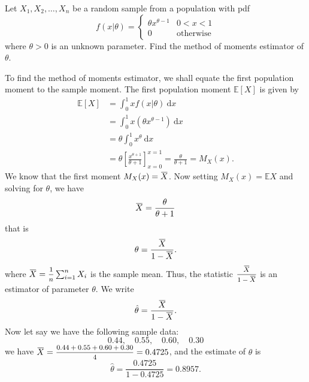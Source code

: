 \begin{example}
    Let $X_1, X_2, \ldots, X_n$ be a random sample from a population with pdf 
    \[
        f(x|\theta) = \begin{cases}
            \theta x^{\theta - 1} & 0 < x < 1\\
            0 & \text{otherwise}
        \end{cases}
    \]
    where $\theta > 0$ is an unknown parameter. Find the method of moments estimator of $\theta$.
\end{example}
\begin{solution}
    To find the method of moments estimator, we shall equate the first population moment to the sample moment.
    The first population moment $\mathbb{E}[X]$ is given by
    \begin{align*}
        \mathbb{E}[X] &= \int_0^1 x f(x|\theta) \> \mathrm{d}x\\
        &= \int_0^1 x (\theta x^{\theta - 1} )\> \mathrm{d}x\\
        &= \theta \int_0^1 x^{\theta} \> \mathrm{d}x\\
        &= \theta \left[ \frac{x^{\theta + 1}}{\theta + 1} \right]_{x=0}^{x=1} = \frac{\theta}{\theta + 1} = M_X(x).
    \end{align*}
    We know that the first moment $M_X(x) = \ols{X}$. Now setting $M_X(x) = \mathbb{E}{X}$ 
    and solving for $\theta$, we have
    \[
        \ols{X} = \frac{\theta}{\theta + 1} 
    \]
    that is
    \[
        \theta = \frac{\ols{X}}{1 - \ols{X}}.
    \]
    where $\ols{X} = \mfrac{1}{n}\sum_{i=1}^n X_i$ is the sample mean. Thus, the statistic 
    $\mfrac{\ols{X}}{1 - \ols{X}}$ is an estimator of parameter $\theta$. We write 
    \[
        \hat{\theta} = \frac{\ols{X}}{1 - \ols{X}}.
    \]
    Now let say we have the following sample data:
    \[
        0.44,\quad 0.55,\quad 0.60,\quad 0.30
    \]
    we have $\ols{X} = \mfrac{0.44 + 0.55 + 0.60 + 0.30}{4} = 0.4725$, and the estimate of $\theta$ is
    \[
        \hat{\theta} = \frac{0.4725}{1 - 0.4725} = 0.8957.
    \]
\end{solution}

